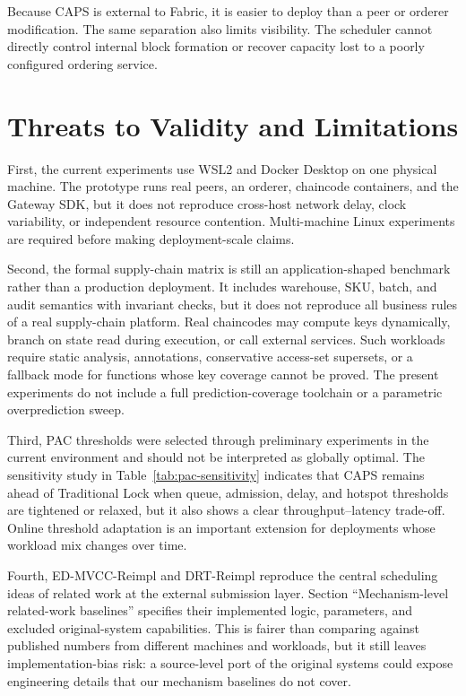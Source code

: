 \documentclass[fleqn,10pt,lineno]{wlpeerj}
\begin{document}
Because CAPS is external to Fabric, it is easier to deploy than a peer or orderer modification. The same separation also limits visibility. The scheduler cannot directly control internal block formation or recover capacity lost to a poorly configured ordering service.

\section*{Threats to Validity and Limitations}

First, the current experiments use WSL2 and Docker Desktop on one physical machine. The prototype runs real peers, an orderer, chaincode containers, and the Gateway SDK, but it does not reproduce cross-host network delay, clock variability, or independent resource contention. Multi-machine Linux experiments are required before making deployment-scale claims.

Second, the formal supply-chain matrix is still an application-shaped benchmark rather than a production deployment. It includes warehouse, SKU, batch, and audit semantics with invariant checks, but it does not reproduce all business rules of a real supply-chain platform. Real chaincodes may compute keys dynamically, branch on state read during execution, or call external services. Such workloads require static analysis, annotations, conservative access-set supersets, or a fallback mode for functions whose key coverage cannot be proved. The present experiments do not include a full prediction-coverage toolchain or a parametric overprediction sweep.

Third, PAC thresholds were selected through preliminary experiments in the current environment and should not be interpreted as globally optimal. The sensitivity study in Table~\ref{tab:pac-sensitivity} indicates that CAPS remains ahead of Traditional Lock when queue, admission, delay, and hotspot thresholds are tightened or relaxed, but it also shows a clear throughput--latency trade-off. Online threshold adaptation is an important extension for deployments whose workload mix changes over time.

Fourth, ED-MVCC-Reimpl and DRT-Reimpl reproduce the central scheduling ideas of related work at the external submission layer. Section ``Mechanism-level related-work baselines'' specifies their implemented logic, parameters, and excluded original-system capabilities. This is fairer than comparing against published numbers from different machines and workloads, but it still leaves implementation-bias risk: a source-level port of the original systems could expose engineering details that our mechanism baselines do not cover.
\end{document}

